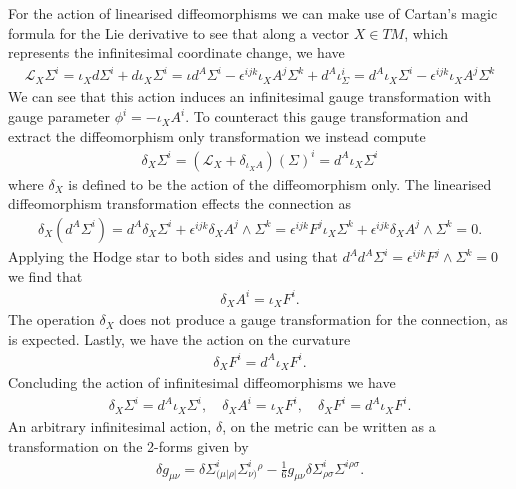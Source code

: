 \documentclass[10pt]{report}
\theoremstyle{definition}
\begin{document}
For the action of linearised diffeomorphisms we can make use of Cartan's magic formula for the Lie derivative to see that along a vector $X \in TM$, which represents the infinitesimal coordinate change, we have
\begin{align}
    \mathcal{L}_X \Sigma^i = \iota_X d \Sigma^i + d \iota_X \Sigma^i = \iota d^A \Sigma^i - \epsilon^{ijk} \iota_X A^j \Sigma^k + d^A \iota_\Sigma^i = d^A \iota_X \Sigma^i - \epsilon^{ijk} \iota_X A^j \Sigma^k
\end{align}
We can see that this action induces an infinitesimal gauge transformation with gauge parameter $\phi^i = -\iota_X A^i$. To counteract this gauge transformation and extract the diffeomorphism only transformation we instead compute
\begin{align}
    \delta_X \Sigma^i = (\mathcal{L}_X + \delta_{\iota_X A})(\Sigma)^i = d^A \iota_X \Sigma^i
\end{align}
where $\delta_X$ is defined to be the action of the diffeomorphism only. The linearised diffeomorphism transformation effects the connection as
\begin{align}
    \delta_X ( d^A \Sigma^i) = d^A \delta_X \Sigma^i + \epsilon^{ijk} \delta_X A^j \wedge \Sigma^k = \epsilon^{ijk} F^j \iota_X \Sigma^k + \epsilon^{ijk} \delta_X A^j \wedge \Sigma^k = 0.
\end{align}
Applying the Hodge star to both sides and using that $d^A d^A \Sigma^i = \epsilon^{ijk} F^j \wedge \Sigma^k = 0$ we find that 
\begin{align}
    \delta_X A^i = \iota_X F^i.
\end{align}
The operation $\delta_X$ does not produce a gauge transformation for the connection, as is expected. Lastly, we have the action on the curvature 
\begin{align}
    \delta_X F^i = d^A \iota_X F^i.
\end{align}
Concluding the action of infinitesimal diffeomorphisms we have 
\begin{align}
    \delta_X \Sigma^i = d^A \iota_X \Sigma^i, \quad \delta_X A^i = \iota_X F^i,\quad \delta_X F^i = d^A \iota_X F^i.
\end{align}
An arbitrary infinitesimal action, $\delta$, on the metric can be written as a transformation on the 2-forms given by
\begin{align}
    \delta g_{\mu\nu} = \delta \Sigma^i_{(\mu|\rho|} \Sigma^i_{\nu)}{}^\rho - \frac{1}{6} g_{\mu\nu} \delta \Sigma^i_{\rho\sigma} \Sigma^{i\rho\sigma}.
\end{align}
\end{document}
